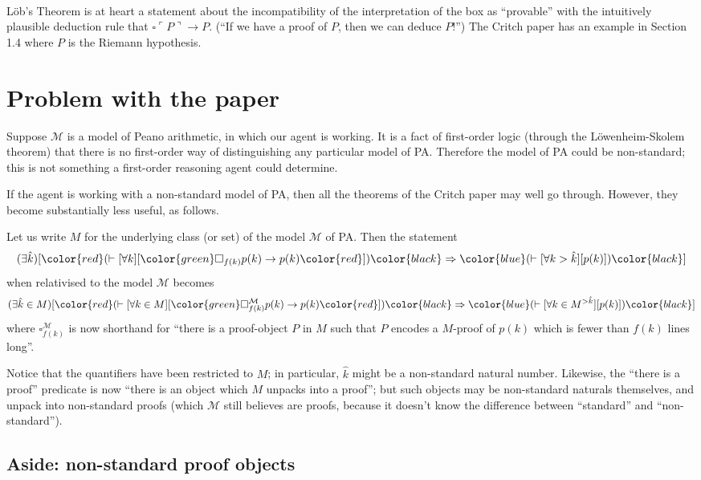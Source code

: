 \documentclass[11pt]{amsart}
\newcommand{\prov}{\square}
\newcommand{\encode}[1]{\ulcorner #1 \urcorner}
\newcommand{\lob}{L\"ob's Theorem}
\begin{document}
\

\lob{} is at heart a statement about the incompatibility of the interpretation of the box as ``provable''
with the intuitively plausible deduction rule that $\prov \encode{P} \to P$.
(``If we have a proof of $P$, then we can deduce $P$!'')
The Critch paper has an example in Section 1.4 where $P$ is the Riemann hypothesis.

\section{Problem with the paper}

Suppose $\mathcal{M}$ is a model of Peano arithmetic, in which our agent is working.
It is a fact of first-order logic (through the L\"owenheim-Skolem theorem) that there is no first-order way of distinguishing any particular model of PA.
Therefore the model of PA could be non-standard; this is not something a first-order reasoning agent could determine.

If the agent is working with a non-standard model of PA, then all the theorems of the Critch paper may well go through.
However, they become substantially less useful, as follows.

Let us write $M$ for the underlying class (or set) of the model $\mathcal{M}$ of PA. Then the statement $$(\exists \hat{k})[\color{red}(\vdash [\forall k][\color{green}\prov_{f(k)} p(k) \to p(k) \color{red}])\color{black} \Rightarrow \color{blue}(\vdash [\forall k > \hat{k}][p(k)]) \color{black}]$$
when relativised to the model $\mathcal{M}$ becomes
$$(\exists \hat{k} \in M)[\color{red}(\vdash [\forall k \in M][\color{green}\prov^{\mathcal{M}}_{f(k)} p(k) \to p(k) \color{red}])\color{black} \Rightarrow \color{blue}(\vdash [\forall k \in M^{>\hat{k}}][p(k)]) \color{black}]$$
where $\prov^{\mathcal{M}}_{f(k)}$ is now shorthand for ``there is a proof-object $P$ in $M$ such that $P$ encodes a $M$-proof of $p(k)$ which is fewer than $f(k)$ lines long''.

Notice that the quantifiers have been restricted to $M$; in particular, $\hat{k}$ might be a non-standard natural number.
Likewise, the ``there is a proof'' predicate is now ``there is an object which $M$ unpacks into a proof''; but such objects may be non-standard naturals themselves, and unpack into non-standard proofs (which $\mathcal{M}$ still believes are proofs, because it doesn't know the difference between ``standard'' and ``non-standard'').

\subsection{Aside: non-standard proof objects}
\end{document}

